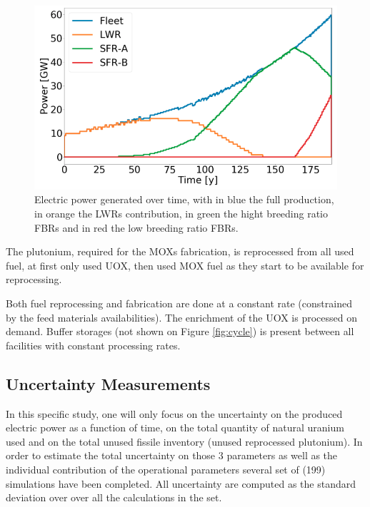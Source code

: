 \documentclass{anstrans}
\begin{document}
\begin{figure}[ht] %
    \centering
    \includegraphics[scale=0.32]{power.png}
    \caption{Electric power generated over time, with in blue the full production,
        in orange the \glspl{LWR} contribution, in green the hight breeding ratio
        \glspl{FBR} and in red the low breeding ratio \glspl{FBR}.}\label{fig:power}
\end{figure}


The plutonium, required for the \glspl{MOX} fabrication, is reprocessed from all
used fuel, at first only used UOX, then used MOX fuel as they start to be
available for reprocessing.

Both fuel reprocessing and fabrication are done at a constant rate (constrained
by the feed materials availabilities). The enrichment of the UOX is processed on
demand. Buffer storages (not shown on Figure \ref{fig:cycle}) is present between
all facilities with constant processing rates.


\subsection{Uncertainty Measurements}
In this specific study, one will only focus on the uncertainty on the produced
electric power as a function of time, on the total quantity of natural uranium
used and on the total unused fissile inventory (unused reprocessed plutonium).
In order to estimate the total uncertainty on those 3 parameters as well as the
individual contribution of the operational parameters several set of (199)
simulations have been completed.  All uncertainty are computed as the standard
deviation over over all the calculations in the set.
\end{document}
